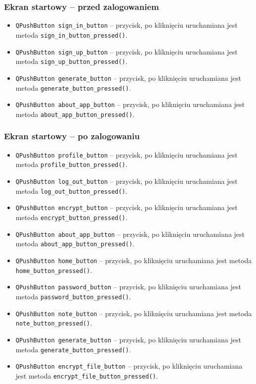 \documentclass[a4paper]{article}
\newcommand{\prog}{\texttt}
\begin{document}
\subsubsection{Ekran startowy -- przed zalogowaniem}
\begin{itemize}
    \item \prog{QPushButton sign\_in\_button} -- przycisk, po kliknięciu uruchamiana jest metoda \prog{sign\_in\_button\_pressed()}.
    \item \prog{QPushButton sign\_up\_button} -- przycisk, po kliknięciu uruchamiana jest metoda \prog{sign\_up\_button\_pressed()}.
    \item \prog{QPushButton generate\_button} -- przycisk, po kliknięciu uruchamiana jest metoda \prog{generate\_button\_pressed()}.
    \item \prog{QPushButton about\_app\_button} -- przycisk, po kliknięciu uruchamiana jest metoda \prog{about\_app\_button\_pressed()}.
\end{itemize}

\subsubsection{Ekran startowy -- po zalogowaniu}
\begin{itemize}
    \item \prog{QPushButton profile\_button} -- przycisk, po kliknięciu uruchamiana jest metoda \prog{profile\_button\_pressed()}.
    \item \prog{QPushButton log\_out\_button} -- przycisk, po kliknięciu uruchamiana jest metoda \prog{log\_out\_button\_pressed()}.
    \item \prog{QPushButton encrypt\_button} -- przycisk, po kliknięciu uruchamiana jest metoda \prog{encrypt\_button\_pressed()}.
    \item \prog{QPushButton about\_app\_button} -- przycisk, po kliknięciu uruchamiana jest metoda \prog{about\_app\_button\_pressed()}.
    \item \prog{QPushButton home\_button} -- przycisk, po kliknięciu uruchamiana jest metoda \prog{home\_button\_pressed()}.
    \item \prog{QPushButton password\_button} -- przycisk, po kliknięciu uruchamiana jest metoda \prog{password\_button\_pressed()}.
    \item \prog{QPushButton note\_button} -- przycisk, po kliknięciu uruchamiana jest metoda \prog{note\_button\_pressed()}.
    \item \prog{QPushButton generate\_button} -- przycisk, po kliknięciu uruchamiana jest metoda \prog{generate\_button\_pressed()}.
    \item \prog{QPushButton encrypt\_file\_button} -- przycisk, po kliknięciu uruchamiana jest metoda \prog{encrypt\_file\_button\_pressed()}.
\end{itemize}
\end{document}
